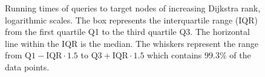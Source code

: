 \begin{figure}[hbtp]
	\centering
	\caption[Running times of queries to target nodes of increasing Dijkstra rank, logarithmic scales.]{Running times of queries to target nodes of increasing Dijkstra rank, logarithmic scales. The box represents the interquartile range (IQR) from the first quartile Q1 to the third quartile Q3. The horizontal line within the IQR is the median. The whiskers represent the range from $\text{Q1} - \text{IQR} \cdot 1.5$ to $\text{Q3} + \text{IQR} \cdot 1.5$ which contains $99.3\%$ of the data points.}
	\label{fig:rank_times}
\end{figure}

